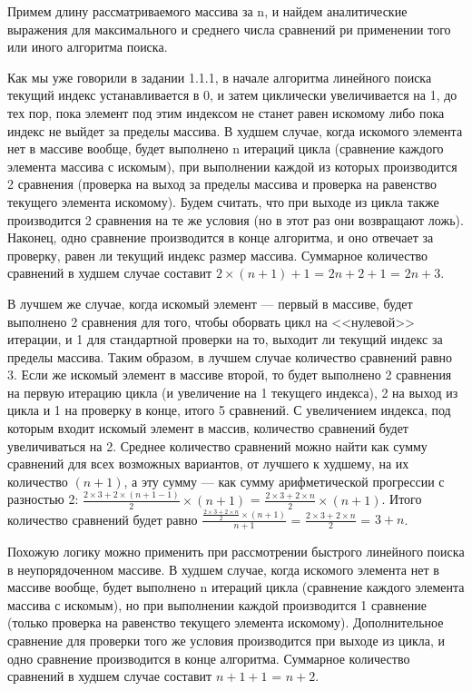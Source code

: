 \documentclass[12pt]{article}
\begin{document}
{	Примем длину рассматриваемого массива за n, и найдем аналитические выражения для максимального и среднего числа сравнений ри применении того или иного алгоритма поиска.
	
	Как мы уже говорили в задании 1.1.1, в начале алгоритма линейного поиска текущий индекс устанавливается в 0, и затем циклически увеличивается на 1, до тех пор, пока элемент под этим индексом не станет равен искомому либо пока индекс не выйдет за пределы массива. В худшем случае, когда искомого элемента нет в массиве вообще, будет выполнено n итераций цикла (сравнение каждого элемента массива с искомым), при выполнении каждой из которых производится 2 сравнения (проверка на выход за пределы массива и проверка на равенство текущего элемента искомому). Будем считать, что при выходе из цикла также производится 2 сравнения на те же условия (но в этот раз они возвращают ложь). Наконец, одно сравнение производится в конце алгоритма, и оно отвечает за проверку, равен ли текущий индекс размер массива. Суммарное количество сравнений в худшем случае составит $2\times(n+1) + 1$ = $2n + 2 + 1$ = $2n + 3$. 
	
	В лучшем же случае, когда искомый элемент --- первый в массиве, будет выполнено 2 сравнения для того, чтобы оборвать цикл на <<нулевой>> итерации, и 1 для стандартной проверки на то, выходит ли текущий индекс за пределы массива. Таким образом, в лучшем случае количество сравнений равно 3. Если же искомый элемент в массиве второй, то будет выполнено 2 сравнения на первую итерацию цикла (и увеличение на 1 текущего индекса), 2 на выход из цикла и 1 на проверку в конце, итого 5 сравнений. С увеличением индекса, под которым входит искомый элемент в массив, количество сравнений будет увеличиваться на 2. Среднее количество сравнений можно найти как сумму сравнений для всех возможных вариантов, от лучшего к худшему, на их количество $(n+1)$, а эту сумму --- как сумму арифметической прогрессии с разностью 2: $\frac{2\times3 + 2 \times(n+1-1)}{2}\times(n+1)$ = $\frac{2\times3 + 2 \times n}{2}\times(n+1)$. Итого количество сравнений будет равно $\frac{\frac{2\times3 + 2 \times n}{2}\times(n+1)}{n+1}$ = $\frac{2\times3 + 2 \times n}{2}$ = $3 + n$.
	
	Похожую логику можно применить при рассмотрении быстрого линейного поиска в неупорядоченном массиве. В худшем случае, когда искомого элемента нет в массиве вообще, будет выполнено n итераций цикла (сравнение каждого элемента массива с искомым), но при выполнении каждой производится 1 сравнение (только проверка на равенство текущего элемента искомому). Дополнительное сравнение для проверки того же условия производится при выходе из цикла, и одно сравнение производится в конце алгоритма. Суммарное количество сравнений в худшем случае составит $n+1 + 1$ = $n + 2$.
	
}
\end{document}
